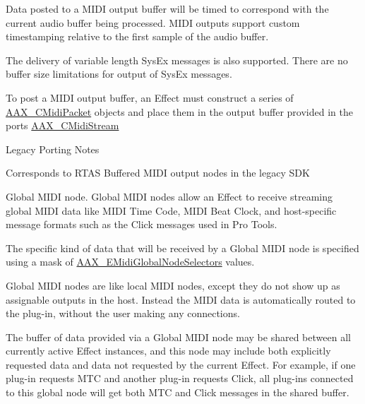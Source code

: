 \begin{Desc}
\begin{description}
Data posted to a M\+I\+D\+I output buffer will be timed to correspond with the current audio buffer being processed. M\+I\+D\+I outputs support custom timestamping relative to the first sample of the audio buffer.

The delivery of variable length Sys\+Ex messages is also supported. There are no buffer size limitations for output of Sys\+Ex messages.

To post a M\+I\+D\+I output buffer, an Effect must construct a series of \hyperlink{a00024}{A\+A\+X\+\_\+\+C\+Midi\+Packet} objects and place them in the output buffer provided in the port\textquotesingle{}s \hyperlink{a00025}{A\+A\+X\+\_\+\+C\+Midi\+Stream}

\begin{DoxyRefDesc}{Legacy Porting Notes}
\item[\hyperlink{a00384__porting_notes000028}{Legacy Porting Notes}]Corresponds to R\+T\+A\+S Buffered M\+I\+D\+I output nodes in the legacy S\+D\+K \end{DoxyRefDesc}
\item[{\em 
\hypertarget{a00206_a5e1dffce35d05990dbbad651702678e4a2be91828f8c1dac20ab5dff136fc1fce}{}A\+A\+X\+\_\+e\+M\+I\+D\+I\+Node\+Type\+\_\+\+Global\label{a00206_a5e1dffce35d05990dbbad651702678e4a2be91828f8c1dac20ab5dff136fc1fce}
}]Global M\+I\+D\+I node. Global M\+I\+D\+I nodes allow an Effect to receive streaming global M\+I\+D\+I data like M\+I\+D\+I Time Code, M\+I\+D\+I Beat Clock, and host-\/specific message formats such as the Click messages used in Pro Tools.

The specific kind of data that will be received by a Global M\+I\+D\+I node is specified using a mask of \hyperlink{a00206_a349dae6bc64bda67a5440cbc6637f92d}{A\+A\+X\+\_\+\+E\+Midi\+Global\+Node\+Selectors} values.

Global M\+I\+D\+I nodes are like local M\+I\+D\+I nodes, except they do not show up as assignable outputs in the host. Instead the M\+I\+D\+I data is automatically routed to the plug-\/in, without the user making any connections.

The buffer of data provided via a Global M\+I\+D\+I node may be shared between all currently active Effect instances, and this node may include both explicitly requested data and data not requested by the current Effect. For example, if one plug-\/in requests M\+T\+C and another plug-\/in requests Click, all plug-\/ins connected to this global node will get both M\+T\+C and Click messages in the shared buffer.


\end{description}
\end{Desc}
